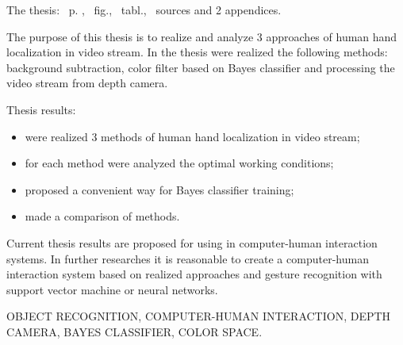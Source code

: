 The thesis: \pageref*{MyLastPage}~p. , \totfig~fig., \tottab~tabl., ~sources and 2 appendices.

The purpose of this thesis is to realize and analyze 3 approaches of human hand localization in video stream. In the thesis were realized the following methods: background subtraction, color filter based on Bayes classifier and processing the video stream from depth camera.

Thesis results:
\begin{itemize}
	\item were realized 3 methods of human hand localization in video stream;
	\item for each method were analyzed the optimal working conditions;
	\item proposed a convenient way for Bayes classifier training;
	\item made a comparison of methods.
\end{itemize}

Current thesis results are proposed for using in computer-human interaction systems. In further researches it is reasonable to create a computer-human interaction system based on realized approaches and gesture recognition with support vector machine or neural networks.

\MakeUppercase{Object recognition, computer-human interaction, depth camera, Bayes classifier, color space.} 